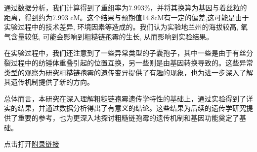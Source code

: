 \documentclass[]{LZUThesis}
\begin{document}
通过数据分析，我们计算得到了重组率为7.993\%，并将其换算为基因与着丝粒的距离，得到约为7.993 cM。这个结果与预期值14.8cM有一定的偏差,这可能是由于实验过程中的技术差异, 环境因素等造成的。我们认为实验地兰州的海拔较高, 氧气含量较低, 可能会影响到粗糙链孢霉的生长, 从而影响到实验结果。

在实验过程中，我们还注意到了一些异常类型的子囊孢子，其中一些是由于有丝分裂过程中的纺锤体重叠引起的位置互换，另一些则是由基因转换导致的。这些异常类型的观察为研究粗糙链孢霉的遗传变异提供了有趣的现象，也为进一步深入了解其遗传机制提供了新的方向。

总体而言，本研究在深入理解粗糙链孢霉遗传学特性的基础上，通过实验得到了详实的结果，并通过数据分析得出了有意义的结论。这些结果为后续的遗传学研究提供了重要的参考，也为更深入地探讨粗糙链孢霉的遗传机制和基因功能奠定了基础。

\backmatter


\printbib



\Appendix
点击打开\href{https://github.com/zehua0417/GeneticExperimentReport}{附录链接}




\end{document}
